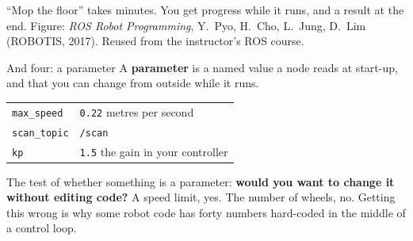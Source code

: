 \documentclass[aspectratio=169]{beamer}
\newcommand{\pyocredit}{Figure: \emph{ROS Robot Programming}, Y.~Pyo,
  H.~Cho, L.~Jung, D.~Lim (ROBOTIS, 2017). Reused from the instructor's ROS course.}
\begin{document}
  {``Mop the floor'' takes minutes. You get progress while it runs, and a result at the end.}
  {\pyocredit}

\begin{frame}{And four: a parameter}
  \small
  A \textbf{parameter} is a named value a node reads at start-up, and that you can change
  from outside while it runs.

  \vspace{0.6em}
  \begin{center}
  \begin{tabular}{@{}ll@{}}
    \toprule
    \texttt{max\_speed} & \texttt{0.22} \quad metres per second \\
    \texttt{scan\_topic} & \texttt{/scan} \\
    \texttt{kp} & \texttt{1.5} \quad the gain in your controller \\
    \bottomrule
  \end{tabular}
  \end{center}

  \vspace{0.8em}
  \begin{inthefield}
    \footnotesize
    The test of whether something is a parameter: \textbf{would you want to change it without
    editing code?} A speed limit, yes. The number of wheels, no. Getting this wrong is why
    some robot code has forty numbers hard-coded in the middle of a control loop.
  \end{inthefield}
\end{frame}
\end{document}

